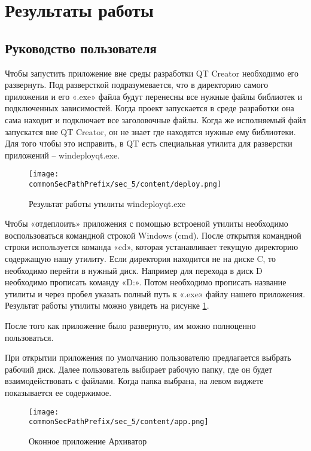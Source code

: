 \section{Результаты работы}
\label{sec:res}


\subsection{Руководство пользователя}


Чтобы запустить приложение вне среды разработки QT Creator необходимо его развернуть.
Под разверсткой подразумевается, что в директорию самого приложения и его «.exe» файла будут перенесны все нужные файлы библиотек и подключенных зависимостей.
Когда проект запускается в среде разработки она сама находит и подключает все заголовочные файлы.
Когда же исполняемый файл запускатся вне QT Creator, он не знает где находятся нужные ему библиотеки.
Для того чтобы это исправить, в QT есть специальная утилита для разверстки приложений -- windeployqt.exe\cite{qt_doc}.


\begin{figure}[h]
    \centering
    \texttt{[image: \\commonSecPathPrefix/sec\_5/content/deploy.png]}
    \caption{Результат работы утилиты windeployqt.exe}
    \label{fig:deploy}
\end{figure}


Чтобы «отдеплоить» приложения с помощью встроеной утилиты необходимо воспользоваться командной строкой Windows (cmd).
После открытия командной строки используется команда «cd», которая устанавливает текущую директорию содержащую нашу утилиту.
Если директория находится не на диске C, то необходимо перейти в нужный диск.
Например для перехода в диск D необходимо прописать команду «D:».
Потом необходимо прописать название утилиты и через пробел указать полный путь к «.exe» файлу нашего приложения.
Результат работы утилиты можно увидеть на рисунке \ref{fig:deploy}.



После того как приложение было развернуто, им можно полноценно пользоваться.



При открытии приложения по умолчанию пользователю предлагается выбрать рабочий диск.
Далее пользователь выбирает рабочую папку, где он будет взаимодействовать с файлами.
Когда папка выбрана, на левом виджете показывается ее содержимое.

\begin{figure}[h]
    \centering
    \texttt{[image: \\commonSecPathPrefix/sec\_5/content/app.png]}
    \caption{Оконное приложение Архиватор}
    \label{fig:app}
\end{figure}



